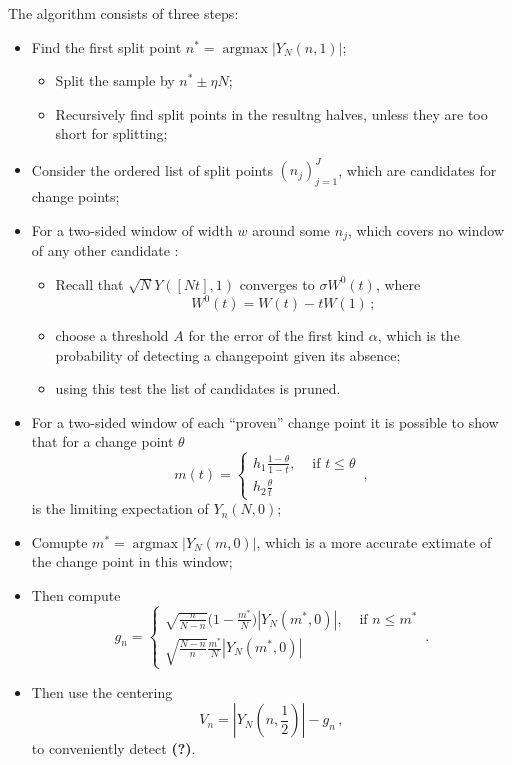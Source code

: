 \documentclass[a4paper]{article}
\newcommand{\wat}{\textbf{(?)}}
\newcommand{\argmax}{\mathop{\text{argmax}}}
\begin{document}
The algorithm consists of three steps:\begin{itemize}
  \item Find the first split point $n^* = \argmax |Y_N(n,1)|$;\begin{itemize}
    \item Split the sample by $n^* \pm \eta N$;
    \item Recursively find split points in the resultng halves, unless they are too
    short for splitting;
  \end{itemize}
  \item Consider the ordered list of split points $(n_j)_{j=1}^J$, which are
  candidates for change points;
  \item For a two-sided window of width $w$ around some $n_j$, which covers no window
    of any other candidate : \begin{itemize}
    \item Recall that $\sqrt{N}Y([Nt], 1)$ converges to $\sigma W^0(t)$, where
    \[ W^0(t) = W(t) - t W(1) \,; \]
    \item choose a threshold $A$ for the error of the first kind $\alpha$, which is
    the probability of detecting a changepoint given its absence;
    \item using this test the list of candidates is pruned.
  \end{itemize}
  \item For a two-sided window of each ``proven'' change point it is possible to show that
  for a change point $\theta$
  \[ m(t) = \begin{cases}
    h_1\frac{1-\theta}{1-t}, &\text{ if }t\leq \theta\\
    h_2\frac{\theta}{t} \end{cases}\,, \]
    is the limiting expectation of $Y_n(N,0)$;
    \item Comupte $m^* = \argmax|Y_N(m, 0)|$, which is a more accurate extimate of
    the change point in this window;
    \item Then compute 
    \[ g_n = \begin{cases}
      \sqrt{\frac{n}{N-n}}\bigl(1-\frac{m^*}{N}\bigr) |Y_N(m^*, 0)|, &\text{ if }n\leq m^*\\
      \sqrt{\frac{N-n}{n}}\frac{m^*}{N} |Y_N(m^*, 0)|
    \end{cases} \,.\]
    \item Then use the centering
    \[  V_n = |Y_N(n, \frac{1}{2})| - g_n \,, \]
    to conveniently detect \wat.
\end{itemize}  
\end{document}
